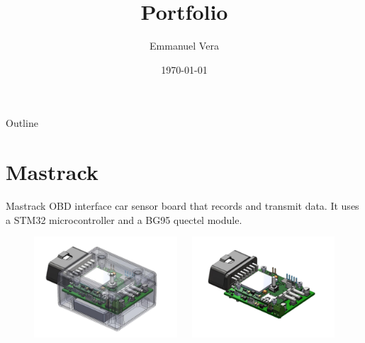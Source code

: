 \documentclass[aspectratio=169]{beamer}
\title[Portfolio] {Portfolio}
\author{Emmanuel Vera}
\institute{Senior Electronics Engineer}
\date{\today}
\begin{document}
\maketitle

\begin{frame}{Outline}
  \tableofcontents
\end{frame}

\section{Mastrack}
\begin{frame}{Mastrack}
  OBD interface car sensor board that records and transmit data. It uses a 
  STM32 microcontroller and a BG95 quectel module.
  \begin{figure}[H]
    \centering
    \begin{columns}[T]
      \begin{column}{.3\linewidth}
        \includegraphics[width=\linewidth]{images/Mastrack1}
      \end{column}
      \begin{column}{.3\linewidth}
        \includegraphics[width=\linewidth]{images/Mastrack2}
      \end{column}
    \end{columns}
  \end{figure}
\end{frame}
\end{document}
